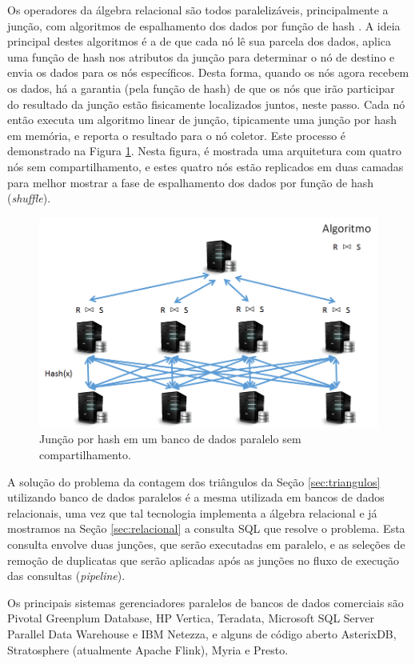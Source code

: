 Os operadores da álgebra relacional são todos paralelizáveis, principalmente
a junção, com algoritmos de espalhamento dos dados por função de hash 
\citep{Schneider1989}. A ideia principal destes algoritmos é a de que cada 
nó lê sua parcela dos dados, aplica uma função de hash nos atributos da
junção para determinar o nó de destino e envia os dados para os nós específicos.
Desta forma, quando os nós agora recebem os dados, há a garantia (pela
função de hash) de que os nós que irão participar do resultado da junção 
estão fisicamente localizados juntos, neste passo. Cada nó então executa um
algoritmo linear de junção, tipicamente uma junção por hash em memória,
e reporta o resultado para o nó coletor. Este processo é demonstrado na 
Figura \ref{fig:mpp_hashjoin}. Nesta figura, é mostrada uma arquitetura
com quatro nós sem compartilhamento, e estes quatro nós estão replicados 
em duas camadas para melhor mostrar a fase de espalhamento dos dados
por função de hash (\emph{shuffle}).

\begin{figure}[!htbp]
        \centering
        \includegraphics[width=\linewidth]{./mpp_hashjoin.png}
        \caption{Junção por hash em um banco de dados paralelo sem compartilhamento.}
        \label{fig:mpp_hashjoin}
\end{figure}

A solução do problema da contagem dos triângulos da Seção \ref{sec:triangulos} utilizando
banco de dados paralelos é a mesma utilizada em bancos de dados relacionais, uma vez que tal tecnologia 
implementa a álgebra relacional e já mostramos na Seção \ref{sec:relacional}
a consulta SQL que resolve o problema. Esta consulta envolve duas junções, 
que serão executadas em paralelo, e as seleções de remoção de duplicatas que
serão aplicadas após as junções no fluxo de execução das consultas (\emph{pipeline}).

Os principais sistemas gerenciadores paralelos de bancos de dados comerciais são Pivotal Greenplum Database, 
HP Vertica, Teradata, Microsoft SQL Server Parallel Data Warehouse e IBM Netezza, e alguns de código 
aberto AsterixDB, Stratosphere (atualmente Apache Flink), Myria e Presto.

